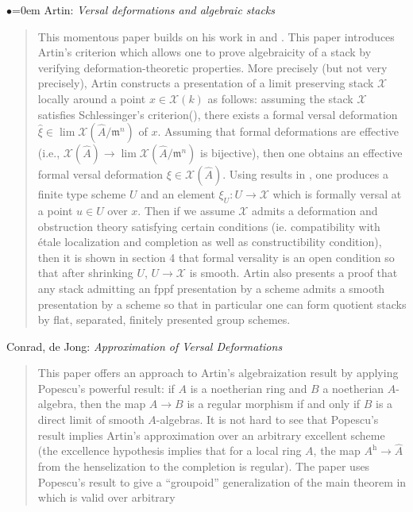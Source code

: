 \begin{list}{$\bullet$}{\leftmargin=0em}
Artin: \emph{Versal deformations and algebraic stacks} \cite{artin_versal}
\begin{quote}
This momentous paper builds on his work in
\cite{artin_approximation} and \cite{artin_algebraizationI}. This paper
introduces Artin's criterion which allows one to prove algebraicity of a
stack by  verifying deformation-theoretic properties. More precisely (but
not very  precisely), Artin constructs a presentation of a limit preserving
stack  $\mathcal{X}$
locally around a point $x \in \mathcal{X}(k)$ as follows: assuming the stack
$\mathcal{X}$
satisfies Schlessinger's criterion(\cite{Sch}), there exists a formal
versal deformation
$\hat{\xi} \in \lim \mathcal{X}(\hat A / \mathfrak m^n)$ of
$x$. Assuming  that formal deformations are effective (i.e.,
$\mathcal{X}(\hat{A}) \to \lim \mathcal{X}(\hat A  / \mathfrak m^n)$
is bijective), then one obtains an effective formal versal
deformation $\xi \in \mathcal{X}(\hat A)$. Using results in
\cite{artin_algebraizationI}, one produces a finite type scheme $U$ and an
element $\xi_U: U \to \mathcal{X}$ which is formally versal at a point
$u \in U$ over $x$. Then if we assume $\mathcal{X}$ admits a deformation
and obstruction theory
satisfying certain conditions (ie. compatibility with \'etale localization and
completion as well as constructibility condition), then it is shown in section
4 that formal versality is an open condition so that after shrinking $U$, $U
\to \mathcal{X}$ is smooth.
Artin also presents a proof that any stack admitting an fppf presentation by
a scheme admits a smooth presentation by a scheme so that in particular
one can form quotient stacks by flat, separated, finitely presented group
schemes.
\end{quote}
\smallskip
\item Conrad, de Jong: \emph{Approximation of Versal Deformations}
\cite{conrad-dejong}
\begin{quote}
This paper offers an approach to Artin's algebraization result by applying
Popescu's powerful result: if $A$ is a noetherian ring and $B$ a noetherian
$A$-algebra, then the map $A \to B$ is a regular morphism if and only if $B$
is a direct limit of smooth $A$-algebras. It is not hard to see that Popescu's
result implies Artin's approximation over an arbitrary excellent scheme (the
excellence hypothesis implies that for a local ring $A$, the map $A^{\text{h}}
\to \hat A$ from the henselization to the completion is regular).
The paper uses Popescu's result to give a ``groupoid'' generalization of the
main theorem in \cite{artin_algebraizationI} which is valid over arbitrary

\end{quote}
\end{list}
